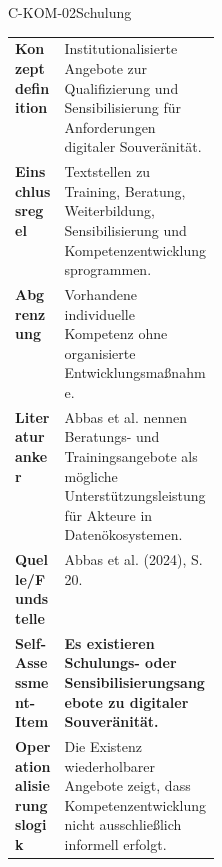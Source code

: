 \documentclass[10pt,a4paper]{article}
\begin{document}
\begin{codecard}{C-KOM-02}{Schulung}
\begin{tabularx}{\linewidth}{@{}>{\RaggedRight\arraybackslash\bfseries\color{DeepNavy}}p{0.245\linewidth}>{\RaggedRight\arraybackslash}X@{}}
Konzeptdefinition & Institutionalisierte Angebote zur Qualifizierung und Sensibilisierung für Anforderungen digitaler Souveränität. \\
\arrayrulecolor{SoftRule}\hline
Einschlussregel & Textstellen zu Training, Beratung, Weiterbildung, Sensibilisierung und Kompetenzentwicklungsprogrammen. \\
\arrayrulecolor{SoftRule}\hline
Abgrenzung & Vorhandene individuelle Kompetenz ohne organisierte Entwicklungsmaßnahme. \\
\arrayrulecolor{SoftRule}\hline
Literaturanker & Abbas et al. nennen Beratungs- und Trainingsangebote als mögliche Unterstützungsleistung für Akteure in Datenökosystemen. \\
\arrayrulecolor{SoftRule}\hline
Quelle/Fundstelle & Abbas et al. (2024), S. 20. \\
\arrayrulecolor{SoftRule}\hline
Self-Assessment-Item & \textbf{Es existieren Schulungs- oder Sensibilisierungsangebote zu digitaler Souveränität.} \\
\arrayrulecolor{SoftRule}\hline
Operationalisierungslogik & Die Existenz wiederholbarer Angebote zeigt, dass Kompetenzentwicklung nicht ausschließlich informell erfolgt. \\
\end{tabularx}
\end{codecard}
\end{document}
